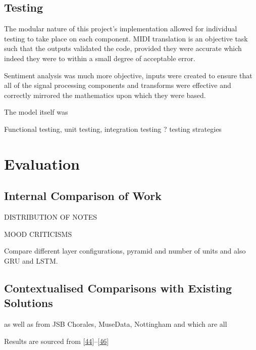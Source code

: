 \documentclass[12pt,]{article}
\begin{document}
\hypertarget{testing}{%
\subsection{Testing}\label{testing}}

The modular nature of this project's implementation allowed for
individual testing to take place on each component. MIDI translation is
an objective task such that the outputs validated the code, provided
they were accurate which indeed they were to within a small degree of
acceptable error.

Sentiment analysis was much more objective, inputs were created to
ensure that all of the signal processing components and transforms were
effective and correctly mirrored the mathematics upon which they were
based.

The model itself was

Functional testing, unit testing, integration testing ? testing
strategies

\hypertarget{evaluation}{%
\section{Evaluation}\label{evaluation}}

\hypertarget{internal-comparison-of-work}{%
\subsection{Internal Comparison of
Work}\label{internal-comparison-of-work}}

DISTRIBUTION OF NOTES

MOOD CRITICISMS

Compare different layer configurations, pyramid and number of units and
also GRU and LSTM.

\hypertarget{contextualised-comparisons-with-existing-solutions}{%
\subsection{Contextualised Comparisons with Existing
Solutions}\label{contextualised-comparisons-with-existing-solutions}}

as well as from JSB Chorales, MuseData, Nottingham and which are all

Results are sourced from
{[}\protect\hyperlink{ref-boulanger2012modeling}{44}{]}--{[}\protect\hyperlink{ref-vohra2015modeling}{46}{]}
\end{document}
